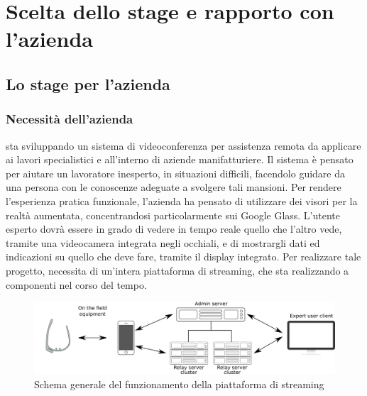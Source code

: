 \chapter{Scelta dello stage e rapporto con l'azienda}

\section{Lo stage per l'azienda}

   \subsection{Necessità dell'azienda}
   \nomeAzienda{} sta sviluppando un sistema di videoconferenza per assistenza remota da applicare ai lavori specialistici e all'interno di aziende manifatturiere. Il sistema è pensato per aiutare un lavoratore inesperto, in situazioni difficili, facendolo guidare da una persona con le conoscenze adeguate a svolgere tali mansioni. Per rendere l'esperienza pratica funzionale, l'azienda ha pensato di utilizzare dei visori per la realtà aumentata, concentrandosi particolarmente sui Google Glass. L'utente esperto dovrà essere in grado di vedere in tempo reale quello che l'altro vede, tramite una videocamera integrata negli occhiali, e di mostrargli dati ed indicazioni su quello che deve fare, tramite il display integrato. Per realizzare tale progetto, \nomeAzienda{} necessita di un'intera piattaforma di streaming, che sta realizzando a componenti nel corso del tempo.
   \begin{figure}[H]
      \begin{center}
         \includegraphics[width=16.5cm,keepaspectratio]{immagini/erastreaming-schema}
      \end{center}
      \caption{Schema generale del funzionamento della piattaforma di streaming}
   \end{figure}
